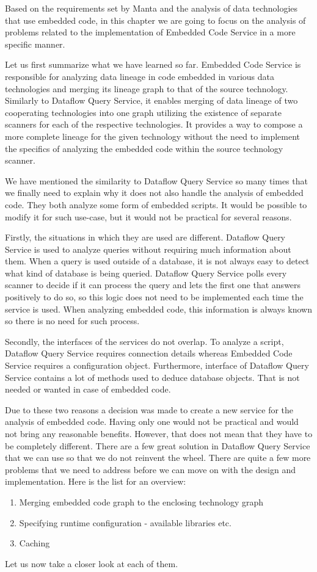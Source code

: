 Based on the requirements set by Manta and the analysis of data technologies that use embedded code, in this chapter we are going to focus on the analysis of problems related to the implementation of Embedded Code Service in a more specific manner.
\par
Let us first summarize what we have learned so far. Embedded Code Service is responsible for analyzing data lineage in code embedded in various data technologies and merging its lineage graph to that of the source technology. Similarly to Dataflow Query Service, it enables merging of data lineage of two cooperating technologies into one graph utilizing the existence of separate scanners for each of the respective technologies. It provides a way to compose a more complete lineage for the given technology without the need to implement the specifics of analyzing the embedded code within the source technology scanner.
\par
We have mentioned the similarity to Dataflow Query Service so many times that we finally need to explain why it does not also handle the analysis of embedded code. They both analyze some form of embedded scripts. It would be possible to modify it for such use-case, but it would not be practical for several reasons.
\par
Firstly, the situations in which they are used are different. Dataflow Query Service is used to analyze queries without requiring much information about them. When a query is used outside of a database, it is not always easy to detect what kind of database is being queried. Dataflow Query Service polls every scanner to decide if it can process the query and lets the first one that answers positively to do so, so this logic does not need to be implemented each time the service is used. When analyzing embedded code, this information is always known so there is no need for such process.
\par
Secondly, the interfaces of the services do not overlap. To analyze a script, Dataflow Query Service requires connection details whereas Embedded Code Service requires a configuration object. Furthermore, interface of Dataflow Query Service contains a lot of methods used to deduce database objects. That is not needed or wanted in case of embedded code.
\par
Due to these two reasons a decision was made to create a new service for the analysis of embedded code. Having only one would not be practical and would not bring any reasonable benefits. However, that does not mean that they have to be completely different. There are a few great solution in Dataflow Query Service that we can use so that we do not reinvent the wheel. There are quite a few more problems that we need to address before we can move on with the design and implementation. Here is the list for an overview:
\begin{enumerate}
    \item Merging embedded code graph to the enclosing technology graph
    \item Specifying runtime configuration - available libraries etc.
    \item Caching
\end{enumerate}
Let us now take a closer look at each of them.

